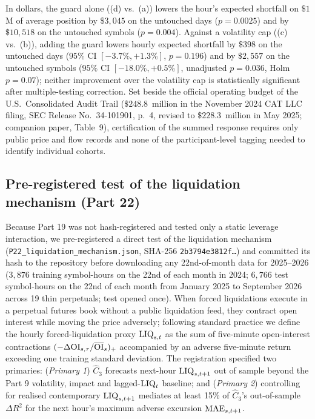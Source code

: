 In dollars, the guard alone ((d) vs.\ (a)) lowers the hour's expected shortfall on $\$1$M of average position by $\$3{,}045$ on the untouched days ($p=0.0025$) and by $\$10{,}518$ on the untouched symbols ($p=0.004$). Against a volatility cap ((c) vs.\ (b)), adding the guard lowers hourly expected shortfall by $\$398$ on the untouched days ($95\%$ CI $[-3.7\%,+1.3\%]$, $p=0.196$) and by $\$2{,}557$ on the untouched symbols ($95\%$ CI $[-18.0\%,+0.5\%]$, unadjusted $p=0.036$, Holm $p=0.07$); neither improvement over the volatility cap is statistically significant after multiple-testing correction. Set beside the official operating budget of the U.S.\ Consolidated Audit Trail ($\$248.8$~million in the November 2024 CAT LLC filing, SEC Release No.\ 34-101901, p.~4, revised to $\$228.3$~million in May 2025; companion paper, Table~9), certification of the summed response requires only public price and flow records and none of the participant-level tagging needed to identify individual cohorts.

\subsection{Pre-registered test of the liquidation mechanism (Part 22)}\label{sec:p22}
Because Part 19 was not hash-registered and tested only a static leverage interaction, we pre-registered a direct test of the liquidation mechanism (\texttt{P22\_liquidation\_mechanism.json}, SHA-256 \texttt{2b3794e3812f\ldots}) and committed its hash to the repository before downloading any 22nd-of-month data for 2025--2026 ($3{,}876$ training symbol-hours on the 22nd of each month in 2024; $6{,}766$ test symbol-hours on the 22nd of each month from January 2025 to September 2026 across 19 thin perpetuals; test opened once). When forced liquidations execute in a perpetual futures book without a public liquidation feed, they contract open interest while moving the price adversely; following standard practice we define the hourly forced-liquidation proxy ${\rm LIQ}_{s,t}$ as the sum of five-minute open-interest contractions $(-\Delta{\rm OI}_{s,\tau}/\overline{\rm OI}_s)_+$ accompanied by an adverse five-minute return exceeding one training standard deviation. The registration specified two primaries: (\emph{Primary 1}) $\hat C_3$ forecasts next-hour ${\rm LIQ}_{s,t+1}$ out of sample beyond the Part 9 volatility, impact and lagged-${\rm LIQ}_t$ baseline; and (\emph{Primary 2}) controlling for realised contemporary ${\rm LIQ}_{s,t+1}$ mediates at least 15\% of $\hat C_3$'s out-of-sample $\Delta R^2$ for the next hour's maximum adverse excursion ${\rm MAE}_{s,t+1}$.

